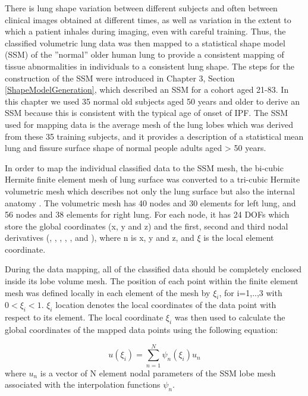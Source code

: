 There is lung shape variation between different subjects and often between clinical images obtained at different times, as well as variation in the extent to which a patient inhales during imaging, even with careful training. Thus, the classified volumetric lung data was then mapped to a statistical shape model (SSM) of the ''normal'' older human lung to provide a consistent mapping of tissue abnormalities in individuals to a consistent lung shape. The steps for the construction of the SSM were introduced in Chapter 3, Section \ref{ShapeModelGeneration}, which described an SSM for a cohort aged 21-83. In this chapter we used 35 normal old subjects aged 50 years and older to derive an SSM because this is consistent with the typical age of onset of IPF. The SSM used for mapping data is the average mesh of the lung lobes which was derived from these 35 training subjects, and it provides a description of a statistical mean lung and fissure surface shape of normal people adults aged > 50 years.

In order to map the individual classified data to the SSM mesh, the bi-cubic Hermite finite element mesh of lung surface was converted to a tri-cubic Hermite volumetric mesh which describes not only the lung surface but also the internal anatomy \citep{tawhai2003developing}. The volumetric mesh has 40 nodes and 30 elements for left lung, and 56 nodes and 38 elements for right lung. For each node, it has 24 DOFs which store the global coordinates (x, y and z) and the first, second and third nodal derivatives (, , , , ,  and ), where n is x, y and z, and $\xi$ is the local element coordinate.

During the data mapping, all of the classified data should be completely enclosed inside its lobe volume mesh. The position of each point within the finite element mesh was defined locally in each element of the mesh by $\xi_{i}$, for i=1,..,3 with $0<\xi_{i}<1$. $\xi_{i}$ location denotes the local coordinates of the data point with respect to its element. The local coordinate $\xi_{i}$ was then used to calculate the global coordinates of the mapped data points using the following equation:

\begin{equation}
u(\xi_{i}) = \sum_{n=1}^{N} \psi_n(\xi_{i})u_n
\end{equation}
where $u_n$ is a vector of N element nodal parameters of the SSM lobe mesh associated with the interpolation functions $\psi_{n}$. 

